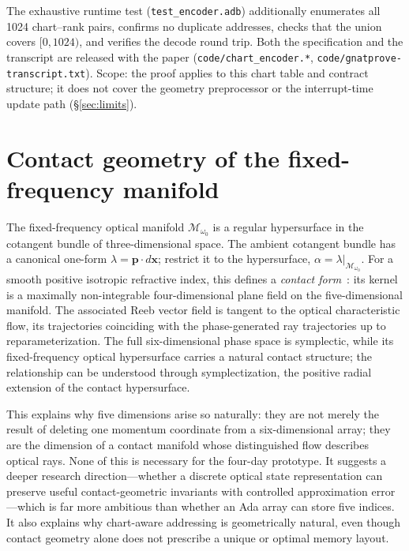 \documentclass[11pt]{article}
\newcommand{\xv}{\mathbf{x}}
\newcommand{\pv}{\mathbf{p}}
\newcommand{\Mopt}{\mathcal{M}_{\omega_0}}
\begin{document}
\noindent The exhaustive runtime test (\texttt{test\_encoder.adb}) additionally
enumerates all 1024 chart--rank pairs, confirms no duplicate addresses, checks that the
union covers $[0,1024)$, and verifies the decode round trip. Both the specification and
the transcript are released with the paper (\texttt{code/chart\_encoder.*},
\texttt{code/gnatprove-transcript.txt}). Scope: the proof applies to this chart table
and contract structure; it does not cover the geometry preprocessor or the
interrupt-time update path (\S\ref{sec:limits}).

\section{Contact geometry of the fixed-frequency manifold}\label{app:contact}



The fixed-frequency optical manifold $\Mopt$ is a regular hypersurface in the cotangent
bundle of three-dimensional space. The ambient cotangent bundle has a canonical
one-form $\lambda = \pv \cdot d\xv$; restrict it to the hypersurface,
$\alpha = \lambda|_{\Mopt}$. For a smooth positive isotropic refractive index, this
defines a \emph{contact form}~\cite{geiges2008}: its kernel is a maximally non-integrable
four-dimensional
plane field on the five-dimensional manifold. The associated Reeb vector field is
tangent to the optical characteristic flow, its trajectories coinciding with the
phase-generated ray trajectories up to reparameterization. The full six-dimensional
phase space is symplectic, while its fixed-frequency optical hypersurface carries a
natural contact structure; the relationship can be understood through symplectization,
the positive radial extension of the contact hypersurface.

This explains why five dimensions arise so naturally: they are not merely the result of
deleting one momentum coordinate from a six-dimensional array; they are the dimension of
a contact manifold whose distinguished flow describes optical rays. None of this is
necessary for the four-day prototype. It suggests a deeper research direction---whether
a discrete optical state representation can preserve useful contact-geometric invariants
with controlled approximation error---which is far more ambitious than whether an Ada
array can store five indices. It also explains why chart-aware addressing is
geometrically natural, even though contact geometry alone does not prescribe a unique or
optimal memory layout.
\end{document}
